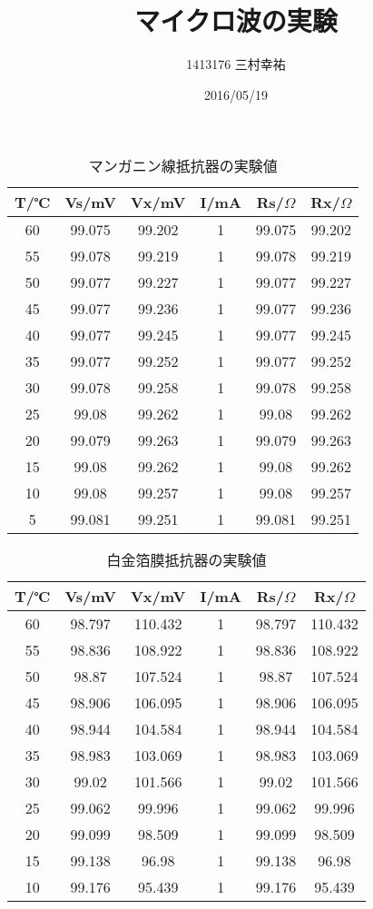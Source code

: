 \documentclass[11pt,a4j]{jsarticle}
\title{マイクロ波の実験}
\author{1413176 三村幸祐}
\date{2016/05/19}
\begin{document}
 
 \begin{table}[htb]
  \begin{center}
    \caption{マンガニン線抵抗器の実験値}
    \begin{tabular}{cccccc} \toprule
T/℃	&	Vs/mV	&	Vx/mV	&	I/mA	&	Rs/$\Omega$	&	Rx/$\Omega$\\ \midrule
60	&	99.075	&	99.202	&	1	&	99.075	&	99.202\\
55	&	99.078	&	99.219	&	1	&	99.078	&	99.219\\
50	&	99.077	&	99.227	&	1	&	99.077	&	99.227\\
45	&	99.077	&	99.236	&	1	&	99.077	&	99.236\\
40	&	99.077	&	99.245	&	1	&	99.077	&	99.245\\
35	&	99.077	&	99.252	&	1	&	99.077	&	99.252\\
30	&	99.078	&	99.258	&	1	&	99.078	&	99.258\\
25	&	99.08	&	99.262	&	1	&	99.08	&	99.262\\
20	&	99.079	&	99.263	&	1	&	99.079	&	99.263\\
15	&	99.08	&	99.262	&	1	&	99.08	&	99.262\\
10	&	99.08	&	99.257	&	1	&	99.08	&	99.257\\
5	&	99.081	&	99.251	&	1	&	99.081	&	99.251\\ \bottomrule
    \end{tabular}
    \label{tab:price}
  \end{center}
\end{table}

 \begin{table}[htb]
  \begin{center}
    \caption{白金箔膜抵抗器の実験値}
    \begin{tabular}{cccccc} \toprule
T/℃	&	Vs/mV	&	Vx/mV	&	I/mA	&	Rs/$\Omega$	&	Rx/$\Omega$\\ \midrule
60	&	98.797	&	110.432	&	1	&	98.797	&	110.432\\
55	&	98.836	&	108.922	&	1	&	98.836	&	108.922\\
50	&	98.87	&	107.524	&	1	&	98.87	&	107.524\\
45	&	98.906	&	106.095	&	1	&	98.906	&	106.095\\
40	&	98.944	&	104.584	&	1	&	98.944	&	104.584\\
35	&	98.983	&	103.069	&	1	&	98.983	&	103.069\\
30	&	99.02	&	101.566	&	1	&	99.02	&	101.566\\
25	&	99.062	&	99.996	&	1	&	99.062	&	99.996\\
20	&	99.099	&	98.509	&	1	&	99.099	&	98.509\\
15	&	99.138	&	96.98	&	1	&	99.138	&	96.98\\
10	&	99.176	&	95.439	&	1	&	99.176	&	95.439\\ \bottomrule
    \end{tabular}
    \label{tab:price}
  \end{center}
\end{table}
\end{document}
